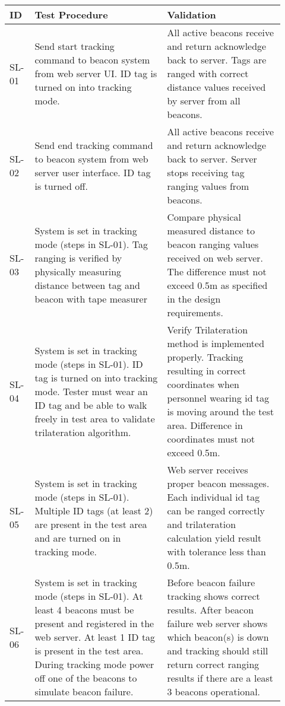 \bgroup
\def\arraystretch{1.2}
\begin{table}[h!]
    \centering
    \begin{tabular}{|p{0.07\linewidth}|p{0.45\linewidth}|p{0.40\linewidth}|} 
    \hline
    ID & Test Procedure & Validation \\ 
    
    \hline
    SL-01
    & Send start tracking command to beacon system from web server UI. ID tag is turned on into tracking mode.  
    & All active beacons receive and return acknowledge  back to server. Tags are ranged with correct distance values received by server from all beacons. \\ 
    \hline    

    \hline
    SL-02
    & Send end tracking command to beacon system from web server user interface. ID tag is turned off.
    & All active beacons receive and return acknowledge back to server. Server stops receiving tag ranging values from beacons.   \\ 
    \hline   
    
    \hline
    SL-03
    & System is set in tracking mode (steps in SL-01). Tag ranging is verified by physically measuring distance between tag and beacon with tape measurer 
    & Compare physical measured distance to beacon ranging values received on web server. The difference must not exceed 0.5m as specified in the design requirements.  \\ 
    \hline   
    
    \hline
    SL-04
    & System is set in tracking mode (steps in SL-01). ID tag is turned on into tracking mode. Tester must wear an ID tag and be able to walk freely in test area to validate trilateration algorithm. 
    & Verify Trilateration method is implemented properly. Tracking resulting in correct coordinates when personnel wearing id tag is moving around the test area. Difference in coordinates must not exceed 0.5m. \\ 
    \hline
    
    \hline
    SL-05
    & System is set in tracking mode (steps in SL-01). Multiple ID tags (at least 2) are present in the test area and are turned on in tracking mode. 
    & Web server receives proper beacon messages. Each individual id tag can be ranged correctly and trilateration calculation yield result with tolerance less than 0.5m.  \\ 
    \hline
    
    \hline
    SL-06
    & System is set in tracking mode (steps in SL-01). At least 4 beacons must be present and registered in the web server. At least 1 ID tag is present in the test area. During tracking mode power off one of the beacons to simulate beacon failure. 
    & Before beacon failure tracking shows correct results. After beacon failure web server shows which beacon(s) is down and tracking should still return correct ranging results if there are a least 3 beacons operational.  \\ 
    

\end{tabular}
\end{table}
